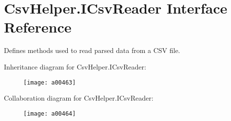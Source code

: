 \hypertarget{a00116}{\section{Csv\-Helper.\-I\-Csv\-Reader Interface Reference}
\label{a00116}
}


Defines methods used to read parsed data from a C\-S\-V file.  




Inheritance diagram for Csv\-Helper.\-I\-Csv\-Reader\-:
\nopagebreak
\begin{figure}[H]
\begin{center}
\leavevmode
\texttt{[image: a00463]}
\end{center}
\end{figure}


Collaboration diagram for Csv\-Helper.\-I\-Csv\-Reader\-:
\nopagebreak
\begin{figure}[H]
\begin{center}
\leavevmode
\texttt{[image: a00464]}
\end{center}
\end{figure}
